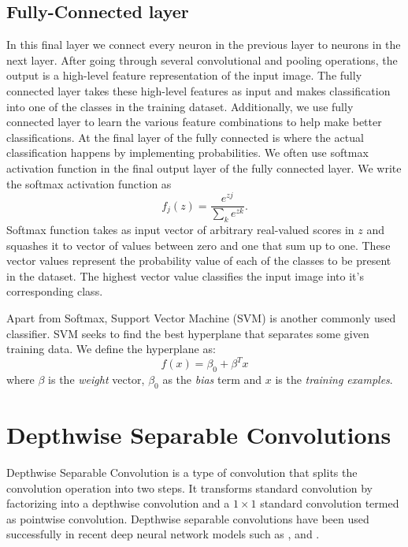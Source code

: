 \documentclass[master]{thesis-uestc}
\begin{document}
\subsection{Fully-Connected layer}
In this final layer we connect every neuron in the previous layer to neurons in the next layer. After going through several convolutional and pooling operations, the output is a high-level feature representation of the input image. The fully connected layer takes these high-level features as input and makes classification into one of the classes in the training dataset. Additionally, we use fully connected layer to learn the various feature combinations to help make better classifications. At the final layer of the fully connected is where the actual classification happens by implementing probabilities. We often use softmax activation function in the final output layer of the fully connected layer. We write the softmax activation function as
\begin{equation*}
    f_j(z) = \frac{e^{zj}}{\sum_{k}^{}e^{zk}}.
\end{equation*}
Softmax function takes as input vector of arbitrary real-valued scores in $z$ and squashes it to vector of values between zero and one that sum up to one. These vector values represent the probability value of each of the classes to be present in the dataset. The highest vector value classifies the input image into it's corresponding class.

Apart from Softmax, Support Vector Machine (SVM) is another commonly used classifier. SVM seeks to find the best hyperplane that separates some given training data. We define the hyperplane as:
\[ f(x) = \beta_{0} + \beta^{T} x \]
where $\beta$ is the \textit{weight} vector, $\beta_{0}$ as the \textit{bias} term and $x$ is the \textit{training examples}.

\section{Depthwise Separable Convolutions}\label{depthconve}
Depthwise Separable Convolution is a type of convolution that splits the convolution operation into two steps. It transforms standard convolution by factorizing into a depthwise convolution and a $1 \times 1$ standard convolution termed as pointwise convolution. Depthwise separable convolutions have been used successfully in recent deep neural network models such as \cite{DBLP:journals/corr/HowardZCKWWAA17}, \cite{DBLP:journals/corr/Chollet16a} and \cite{8451339}.
\end{document}
